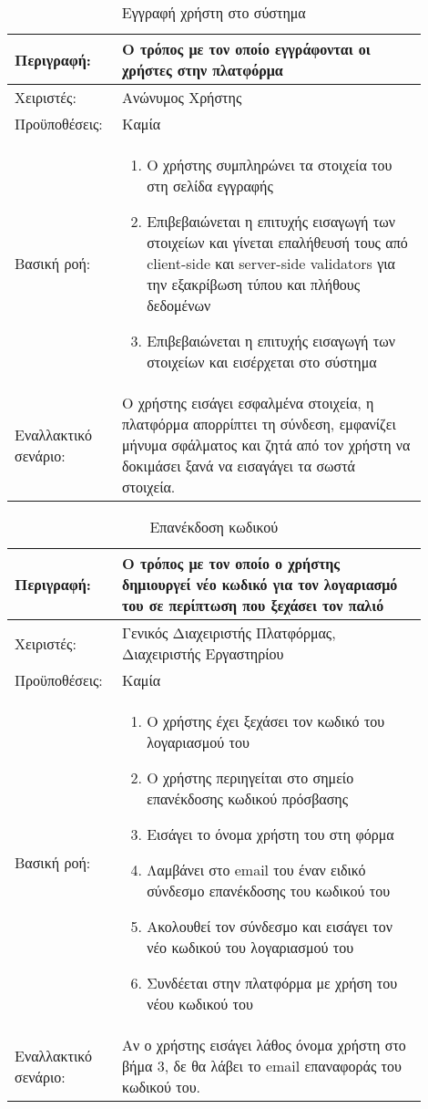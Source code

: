 \begin{table}[h]
	\caption{Εγγραφή χρήστη στο σύστημα}
	\label{tab:use-case-register}
	\begin{tabular}{|p{0.2\linewidth}|p{0.7\linewidth}|}
		\hline
		Περιγραφή: & Ο τρόπος με τον οποίο εγγράφονται οι χρήστες στην πλατφόρμα \\ \hline
		Χειριστές: & Ανώνυμος Χρήστης \\ \hline
		Προϋποθέσεις: & Καμία \\ \hline
		Βασική ροή: & 
		\begin{enumerate}
			\item Ο χρήστης συμπληρώνει τα στοιχεία του στη σελίδα εγγραφής
			\item Επιβεβαιώνεται η επιτυχής εισαγωγή των στοιχείων και γίνεται επαλήθευσή τους από client-side και server-side validators για την εξακρίβωση τύπου και πλήθους δεδομένων
			\item Επιβεβαιώνεται η επιτυχής εισαγωγή των στοιχείων και εισέρχεται στο σύστημα
		\end{enumerate} \\ \hline
		Εναλλακτικό σενάριο: & O χρήστης εισάγει εσφαλμένα στοιχεία, η πλατφόρμα απορρίπτει τη σύνδεση, εμφανίζει μήνυμα σφάλματος και ζητά από τον χρήστη να δοκιμάσει ξανά να εισαγάγει τα σωστά στοιχεία.                     \\ \hline
	\end{tabular}
\end{table}

\begin{table}[h]
	\caption{Επανέκδοση κωδικού}
	\label{tab:use-case-forgot-password}
	\begin{tabular}{|p{0.2\linewidth}|p{0.7\linewidth}|}
		\hline
		Περιγραφή: & Ο τρόπος με τον οποίο ο χρήστης δημιουργεί νέο κωδικό για τον λογαριασμό του σε περίπτωση που ξεχάσει τον παλιό \\ \hline
		Χειριστές: & Γενικός Διαχειριστής Πλατφόρμας, Διαχειριστής Εργαστηρίου \\ \hline
		Προϋποθέσεις: & Καμία \\ \hline
		Βασική ροή: & 
		\begin{enumerate}
			\item Ο χρήστης έχει ξεχάσει τον κωδικό του λογαριασμού του
			\item Ο χρήστης περιηγείται στο σημείο επανέκδοσης κωδικού πρόσβασης
			\item Εισάγει το όνομα χρήστη του στη φόρμα
			\item Λαμβάνει στο email του έναν ειδικό σύνδεσμο επανέκδοσης του κωδικού του
			\item Ακολουθεί τον σύνδεσμο και εισάγει τον νέο κωδικού του λογαριασμού του
			\item Συνδέεται στην πλατφόρμα με χρήση του νέου κωδικού του
		\end{enumerate} \\ \hline
		Εναλλακτικό σενάριο: & Αν ο χρήστης εισάγει λάθος όνομα χρήστη στο βήμα 3, δε θα λάβει το email επαναφοράς του κωδικού του. \\ \hline
	\end{tabular}
\end{table}

